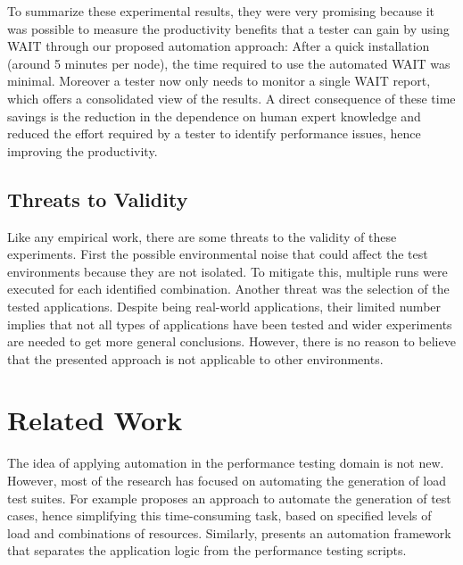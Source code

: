 \documentclass[runningheads,a4paper]{llncs}
\begin{document}
To summarize these experimental results, they were very promising because it
was possible to measure the productivity benefits that a tester can gain by using
WAIT through our proposed automation approach: After a quick installation
(around 5 minutes per node), the time required to use the automated WAIT was
minimal. Moreover a tester now only needs to monitor a single WAIT report, which
offers a consolidated view of the results. A direct consequence of these
time savings is the reduction in the dependence on human expert knowledge and
reduced the effort required by a tester to identify performance issues, hence
improving the productivity.

\vspace{-7pt}
\subsection{Threats to Validity}
\vspace{-7pt}
Like any empirical work, there are some threats to the validity of these
experiments. First the possible environmental noise that could affect the test
environments because they are not isolated. To mitigate this, multiple runs were
executed for each identified combination. Another threat was the selection of
the tested applications. Despite being real-world applications, their limited
number implies that not all types of applications have been tested and wider
experiments are needed to get more general conclusions. However, there is no
reason to believe that the presented approach is not applicable to other
environments.

\vspace{-7pt}
\section{Related Work}
\label{RelatedWork}
\vspace{-7pt}

The idea of applying automation in the performance testing domain is not new.
However, most of the research has focused on automating the generation of load
test
suites\cite{Elvira1,Bayan1,Zhang1,Briand1,Avritzer2,Avritzer3,Chen1,Garousi1}.
For example \cite{Bayan1} proposes an approach to automate the generation of test 
cases, hence simplifying this time-consuming task, based on specified levels of
load and combinations of resources. Similarly, \cite{Chen1} presents an
automation framework that separates the application logic from the performance
testing scripts.
\end{document}
